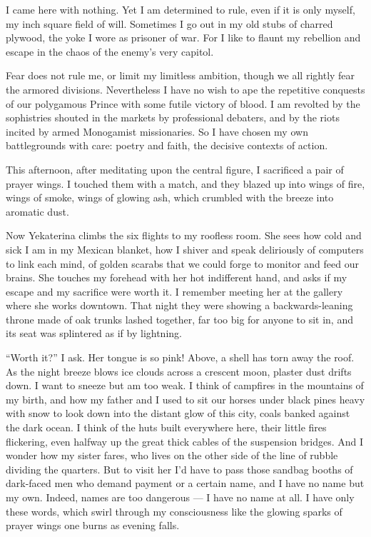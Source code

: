 \documentclass[english,11pt,letterpaper,onecolumn,parskip=full]{scrbook}
\begin{document}
	I came here with nothing.  Yet I am determined to rule, even if it is only myself, my inch square field of will.  Sometimes I go out in my old stubs of charred plywood, the yoke I wore as prisoner of war.  For I like to flaunt my rebellion and escape in the chaos of the enemy's very capitol.

	Fear does not rule me, or limit my limitless ambition, though we all rightly fear the armored divisions.  Nevertheless I have no wish to ape the repetitive conquests of our polygamous Prince with some futile victory of blood.  I am revolted by the sophistries shouted in the markets by professional debaters, and by the riots incited by armed Monogamist missionaries.  So I have chosen my own battlegrounds with care:  poetry and faith, the decisive contexts of action.

	This afternoon, after meditating upon the central figure, I sacrificed a pair of prayer wings.  I touched them with a match, and they blazed up into wings of fire, wings of smoke, wings of glowing ash, which crumbled with the breeze into aromatic dust.

	Now Yekaterina climbs the six flights to my roofless room.  She sees how cold and sick I am in my Mexican blanket, how I shiver and speak deliriously of computers to link each mind, of golden scarabs that we could forge to monitor and feed our brains.  She touches my forehead with her hot indifferent hand, and asks if my escape and my sacrifice were worth it.  I remember meeting her at the gallery where she works downtown.  That night they were showing a backwards-leaning throne made of oak trunks lashed together, far too big for anyone to sit in, and its seat was splintered as if by lightning.

	``Worth it?'' I ask.  Her tongue is so pink!  Above, a shell has torn away the roof.  As the night breeze blows ice clouds across a crescent moon, plaster dust drifts down.  I want to sneeze but am too weak.  I think of campfires in the mountains of my birth, and how my father and I used to sit our horses under black pines heavy with snow to look down into the distant glow of this city, coals banked against the dark ocean.  I think of the huts built everywhere here, their little fires flickering, even halfway up the great thick cables of the suspension bridges.  And I wonder how my sister fares, who lives on the other side of the line of rubble dividing the quarters.  But to visit her I'd have to pass those sandbag booths of dark-faced men who demand payment or a certain name, and I have no name but my own.  Indeed, names are too dangerous --- I have no name at all.  I have only these words, which swirl through my consciousness like the glowing sparks of prayer wings one burns as evening falls.
\end{document}

